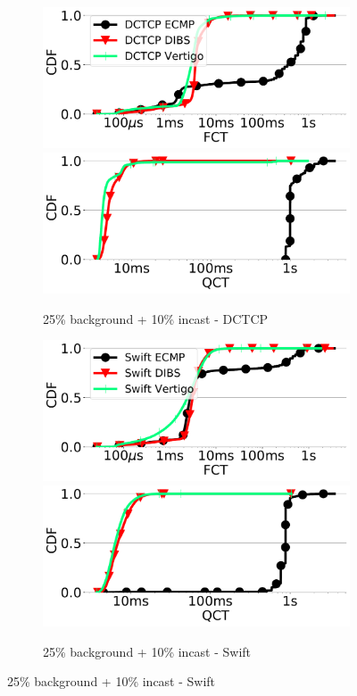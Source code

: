 
\begin{figure}[t]
    \begin{subfigure}[t]{.48\linewidth}
	\centering
	\includegraphics[width=0.49\linewidth]{figs/fattree25_35dctcpfctcdf.pdf}
	\includegraphics[width=0.49\linewidth]{figs/fattree25_35dctcpqctcdf.pdf}
		\caption{\small{25\% background + 10\% incast - DCTCP}}
		\label{fig:fattreedc35}
	\end{subfigure}
	\begin{subfigure}[t]{.48\linewidth}
	\centering
	\includegraphics[width=0.49\linewidth]{figs/fattree25_35swiftfctcdf.pdf}
	\includegraphics[width=0.49\linewidth]{figs/fattree25_35swiftqctcdf.pdf}
		\caption{\small{25\% background + 10\% incast - Swift}}
		\label{fig:fattreesw35}
	\end{subfigure}
	

\end{figure}
